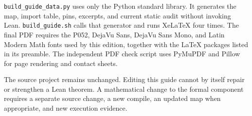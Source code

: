 \documentclass[11pt,a4paper]{article}
\newcommand{\code}[1]{\nolinkurl{#1}}
\begin{document}
\code{build_guide_data.py} uses only the Python standard library. It generates the map, import table, pins, excerpts, and current static audit without invoking Lean. \code{build_guide.sh} calls that generator and runs XeLaTeX four times. The final PDF requires the P052, DejaVu Sans, DejaVu Sans Mono, and Latin Modern Math fonts used by this edition, together with the LaTeX packages listed in its preamble. The independent PDF check script uses PyMuPDF and Pillow for page rendering and contact sheets.

The source project remains unchanged. Editing this guide cannot by itself repair or strengthen a Lean theorem. A mathematical change to the formal component requires a separate source change, a new compile, an updated map when appropriate, and new execution evidence.
\end{document}

